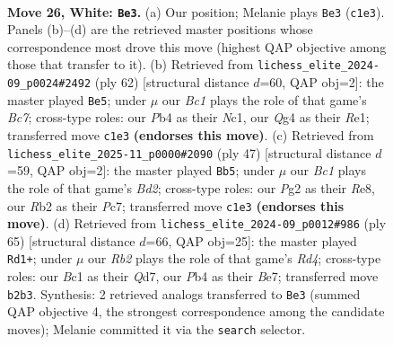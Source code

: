 \documentclass[11pt]{article}
\begin{document}
\clearpage

\begin{figure}[p]\centering
\begin{subfigure}{0.46\textwidth}\centering
\resizebox{\linewidth}{!}{%
\newchessgame
\chessboard[
  setfen={r7/2p2kpp/3p4/8/pP4Q1/2bq4/PR3PPP/2B3K1 w - - 0 26},
  showmover=false,
  pgfstyle=straightmove, color=movearrow, markmove={c1-e3}
]}
\caption{}
\end{subfigure}\hfill
\begin{subfigure}{0.46\textwidth}\centering
\resizebox{\linewidth}{!}{%
\newchessgame
\chessboard[
  setfen={1Q6/2B3bk/b6p/3q1pp1/3Pp3/4P3/1P4PP/2N1R1K1 w - - 0 32},
  showmover=false,
  pgfstyle=straightmove, color=movearrow, markmove={c7-e5}
]}
\caption{}
\end{subfigure}
\\[4pt]
\begin{subfigure}{0.46\textwidth}\centering
\resizebox{\linewidth}{!}{%
\newchessgame
\chessboard[
  setfen={4r1k1/1qpb1ppp/4p3/R7/3Pp3/1P4P1/2QBPP1P/6K1 b - - 3 24},
  showmover=false,
  pgfstyle=straightmove, color=movearrow, markmove={d7-b5}
]}
\caption{}
\end{subfigure}\hfill
\begin{subfigure}{0.46\textwidth}\centering
\resizebox{\linewidth}{!}{%
\newchessgame
\chessboard[
  setfen={6k1/1p1qbpp1/8/p2r3p/4Q3/4B2P/5PP1/2R3K1 b - - 9 33},
  showmover=false,
  pgfstyle=straightmove, color=movearrow, markmove={d5-d1}
]}
\caption{}
\end{subfigure}
\caption{\textbf{Move 26, White: \texttt{Be3}.} (a) Our position; Melanie plays \texttt{Be3} (\texttt{c1e3}). Panels (b)--(d) are the retrieved master positions whose correspondence most drove this move (highest QAP objective among those that transfer to it). (b) Retrieved from \texttt{lichess\_elite\_2024-09\_p0024\#2492} (ply 62) [structural distance $d$=60, QAP obj=2]: the master played \texttt{Be5}; under $\mu$ our \emph{Bc1} plays the role of that game's \emph{Bc7}; cross-type roles: our \emph{P}b4 as their \emph{N}c1, our \emph{Q}g4 as their \emph{R}e1; transferred move \texttt{c1e3} \textbf{(endorses this move)}. (c) Retrieved from \texttt{lichess\_elite\_2025-11\_p0000\#2090} (ply 47) [structural distance $d$=59, QAP obj=2]: the master played \texttt{Bb5}; under $\mu$ our \emph{Bc1} plays the role of that game's \emph{Bd2}; cross-type roles: our \emph{P}g2 as their \emph{R}e8, our \emph{R}b2 as their \emph{P}c7; transferred move \texttt{c1e3} \textbf{(endorses this move)}. (d) Retrieved from \texttt{lichess\_elite\_2024-09\_p0012\#986} (ply 65) [structural distance $d$=66, QAP obj=25]: the master played \texttt{Rd1+}; under $\mu$ our \emph{Rb2} plays the role of that game's \emph{Rd4}; cross-type roles: our \emph{B}c1 as their \emph{Q}d7, our \emph{P}b4 as their \emph{B}e7; transferred move \texttt{b2b3}. Synthesis: 2 retrieved analogs transferred to \texttt{Be3} (summed QAP objective 4, the strongest correspondence among the candidate moves); Melanie committed it via the \texttt{search} selector.}
\label{fig:thought-m50}
\end{figure}
\end{document}
